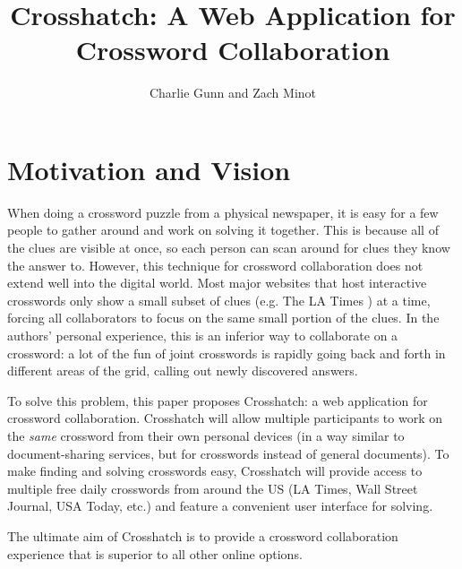 \documentclass{article}
\author{Charlie Gunn and Zach Minot}
\title{Crosshatch: A Web Application for Crossword Collaboration}
\begin{document}
\maketitle

\section{Motivation and Vision}
\label{mot}
When doing a crossword puzzle from a physical newspaper, it is easy for a few people to gather around and work on solving it together.
This is because all of the clues are visible at once, so each person can scan around for clues they know the answer to. However, this technique
for crossword collaboration does not extend well into the digital world. Most major websites that host interactive crosswords only show a small subset of
clues (e.g. The LA Times \cite{latcrossword}) at a time, forcing all collaborators to focus on the same small portion of the clues. In the authors' personal experience,
this is an inferior way to collaborate on a crossword: a lot of the fun of joint crosswords is rapidly going back and forth in different areas
of the grid, calling out newly discovered answers.

To solve this problem, this paper proposes Crosshatch: a web application for crossword collaboration. Crosshatch will
allow multiple participants to work on the \textit{same} crossword from their own personal devices (in a way similar to document-sharing services,
but for crosswords instead of general documents). To make finding and solving crosswords easy, Crosshatch will provide access to multiple free daily crosswords
from around the US (LA Times, Wall Street Journal, USA Today, etc.) and feature a convenient user interface for solving.

The ultimate aim of Crosshatch is to provide a crossword collaboration experience that is superior to all other online options.
\newpage
\end{document}
